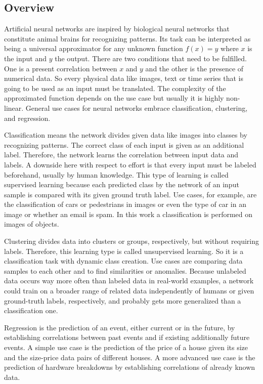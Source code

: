 \subsection{Overview}
\label{sec:neural-networks-overview}
Artificial neural networks are inspired by biological neural networks that constitute animal brains for recognizing patterns.
Its task can be interpreted as being a universal approximator for any unknown function $f(x) = y$ where $x$ is the input and $y$ the output.
There are two conditions that need to be fulfilled.
One is a present correlation between $x$ and $y$ and the other is the presence of numerical data.
So every physical data like images, text or time series that is going to be used as an input must be translated.
The complexity of the approximated function depends on the use case but usually it is highly non-linear.
General use cases for neural networks embrace classification, clustering, and regression.

Classification means the network divides given data like images into classes by recognizing patterns.
The correct class of each input is given as an additional label.
Therefore, the network learns the correlation between input data and labels.
A downside here with respect to effort is that every input must be labeled beforehand, usually by human knowledge.
This type of learning is called supervised learning because each predicted class by the network of an input sample is compared with its given ground truth label.
Use cases, for example, are the classification of cars or pedestrians in images or even the type of car in an image or whether an email is spam.
In this work a classification is performed on images of objects.

Clustering divides data into clusters or groups, respectively, but without requiring labels.
Therefore, this learning type is called unsupervised learning.
So it is a classification task with dynamic class creation.
Use cases are comparing data samples to each other and to find similarities or anomalies.
Because unlabeled data occurs way more often than labeled data in real-world examples, a network could train on a broader range of related data independently of humans or given ground-truth labels, respectively, and probably gets more generalized than a classification one.

Regression is the prediction of an event, either current or in the future, by establishing correlations between past events and if existing additionally future events.
A simple use case is the prediction of the price of a house given its size and the size-price data pairs of different houses.
A more advanced use case is the prediction of hardware breakdowns by establishing correlations of already known data.